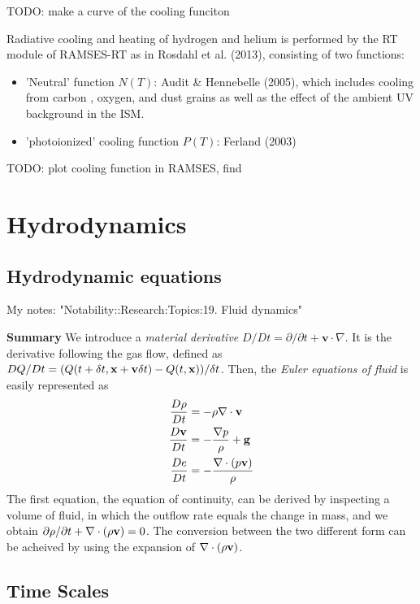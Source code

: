 TODO: make a curve of the cooling funciton

Radiative cooling and heating of hydrogen and helium is performed by the
RT module of RAMSES-RT as in Rosdahl et al. (2013), consisting of two
functions:

\begin{itemize}
\item 'Neutral' function \(N(T)\): Audit \& Hennebelle (2005), which includes
cooling from carbon , oxygen, and dust grains as well as the effect of
the ambient UV background in the ISM.

\item 'photoionized' cooling function \(P(T)\): Ferland (2003)
\end{itemize}

TODO: plot cooling function in RAMSES, find

\section{Hydrodynamics}
\label{sec:org272fbfc}

\subsection{Hydrodynamic equations}
\label{sec:orgbed52d2}

My notes: "Notability::Research:Topics:19. Fluid dynamics"

\textbf{Summary}
We introduce a \emph{material derivative} \(D/Dt = \partial/\partial t + \mathbf{v} \cdot \nabla\). It is the derivative following the gas flow, defined as \(D Q / Dt = (Q(t+\delta t, {\bf x} + {\bf v}\delta t) - Q(t, {\bf x}))/\delta t\). Then, the \emph{Euler equations of fluid} is easily represented as
\begin{align}
\frac{D \rho}{D t} &= - \rho \nabla \cdot {\bf v} \\
\frac{D {\bf v}}{D t} &= - \frac{\nabla p}{\rho} + {\bf g} \\
\frac{D e}{D t} &= - \frac{\nabla \cdot (p {\bf v})}{\rho}
\end{align}
The first equation, the equation of continuity, can be derived by inspecting a volume of fluid, in which the outflow rate equals the change in mass, and we obtain \(\partial \rho / \partial t + \nabla \cdot (\rho {\bf v}) = 0\). The conversion between the two different form can be acheived by using the expansion of \(\nabla \cdot (\rho {\bf v})\).

\subsection{Time Scales}
\label{sec:org89229c6}
